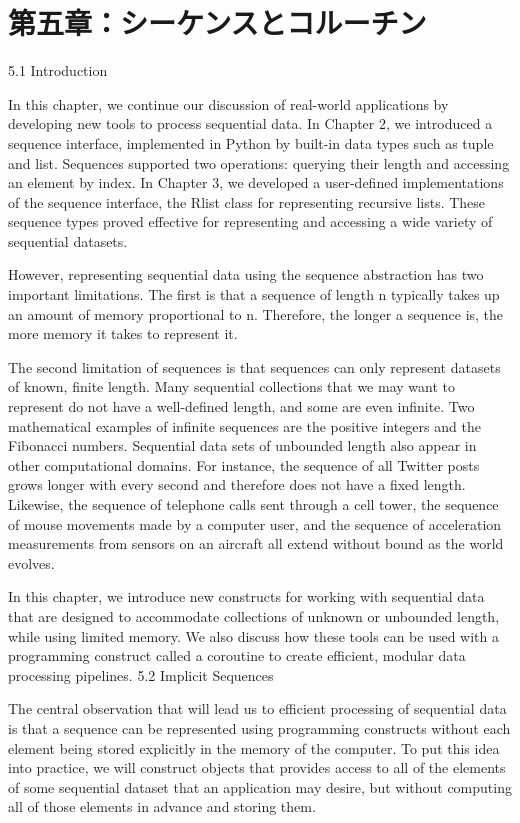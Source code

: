 \documentclass[letterpaper,10pt,dvipdfmx]{sphinxmanual}
\begin{document}
\chapter{第五章：シーケンスとコルーチン}
\label{streams::doc}\label{streams:id1}
5.1   Introduction

In this chapter, we continue our discussion of real-world applications by developing new tools to process sequential data. In Chapter 2, we introduced a sequence interface, implemented in Python by built-in data types such as tuple and list. Sequences supported two operations: querying their length and accessing an element by index. In Chapter 3, we developed a user-defined implementations of the sequence interface, the Rlist class for representing recursive lists. These sequence types proved effective for representing and accessing a wide variety of sequential datasets.

However, representing sequential data using the sequence abstraction has two important limitations. The first is that a sequence of length n typically takes up an amount of memory proportional to n. Therefore, the longer a sequence is, the more memory it takes to represent it.

The second limitation of sequences is that sequences can only represent datasets of known, finite length. Many sequential collections that we may want to represent do not have a well-defined length, and some are even infinite. Two mathematical examples of infinite sequences are the positive integers and the Fibonacci numbers. Sequential data sets of unbounded length also appear in other computational domains. For instance, the sequence of all Twitter posts grows longer with every second and therefore does not have a fixed length. Likewise, the sequence of telephone calls sent through a cell tower, the sequence of mouse movements made by a computer user, and the sequence of acceleration measurements from sensors on an aircraft all extend without bound as the world evolves.

In this chapter, we introduce new constructs for working with sequential data that are designed to accommodate collections of unknown or unbounded length, while using limited memory. We also discuss how these tools can be used with a programming construct called a coroutine to create efficient, modular data processing pipelines.
5.2   Implicit Sequences

The central observation that will lead us to efficient processing of sequential data is that a sequence can be represented using programming constructs without each element being stored explicitly in the memory of the computer. To put this idea into practice, we will construct objects that provides access to all of the elements of some sequential dataset that an application may desire, but without computing all of those elements in advance and storing them.
\end{document}
